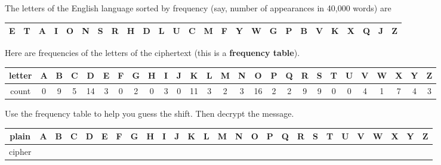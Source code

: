 \documentclass[12pt]{article}
\renewcommand{\emph}[1]{\textsf{\textbf{#1}}}
\begin{document}
\begin{enumerate}
The letters of the English language sorted by frequency (say, number of appearances in 40,000 words) are

\hspace*{-1cm}
{\footnotesize
\begin{tabular}{|c|c|c|c|c|c|c|c|c|c|c|c|c|c|c|c|c|c|c|c|c|c|c|c|c|c|}
\hline
 E&T&A&I&O&N&S&R&H&D&L&U&C&M&F&Y&W&G&P&B&V&K&X&Q&J&Z\\  %
\hline
\end{tabular}
}

Here are frequencies of the letters of the ciphertext (this is a \emph{frequency table}).

\hspace*{-1cm}
{\scriptsize
\begin{tabular}{|c|c|c|c|c|c|c|c|c|c|c|c|c|c|c|c|c|c|c|c|c|c|c|c|c|c|c|}
\hline
letter& A&B&C&D&E&F&G&H&I&J&K&L&M&N&O&P&Q&R&S&T&U&V&W&X&Y&Z\\  \hline \hline
count&0&9&5&14&3&0&2&0&3&0&11&3&2&3&16&2&2&9&9&0&0&4&1&7&4&3\\
\hline
\end{tabular}
}

Use the frequency table to help you guess the shift. Then decrypt the message.

\hspace*{-1cm}
{\scriptsize
\begin{tabular}{|c|c|c|c|c|c|c|c|c|c|c|c|c|c|c|c|c|c|c|c|c|c|c|c|c|c|c|}
\hline
plain& A&B&C&D&E&F&G&H&I&J&K&L&M&N&O&P&Q&R&S&T&U&V&W&X&Y&Z\\  \hline
cipher& & & &&&&&&&&&&&&&&&&&&&&&&&\\[12pt]
\hline
\end{tabular}
}







\end{enumerate}
\end{document}
